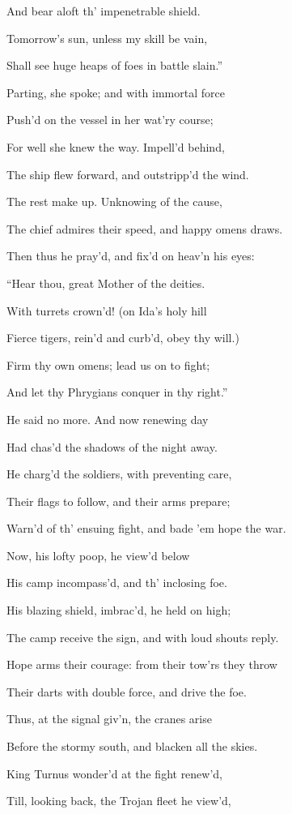 And bear aloft th’ impenetrable shield.

Tomorrow’s sun, unless my skill be vain,

Shall see huge heaps of foes in battle slain.”

Parting, she spoke; and with immortal force

Push’d on the vessel in her wat’ry course;

For well she knew the way. Impell’d behind,

The ship flew forward, and outstripp’d the wind.

The rest make up. Unknowing of the cause,

The chief admires their speed, and happy omens draws.

Then thus he pray’d, and fix’d on heav’n his eyes:

“Hear thou, great Mother of the deities.

With turrets crown’d! (on Ida’s holy hill

Fierce tigers, rein’d and curb’d, obey thy will.)

Firm thy own omens; lead us on to fight;

And let thy Phrygians conquer in thy right.”

He said no more. And now renewing day

Had chas’d the shadows of the night away.

He charg’d the soldiers, with preventing care,

Their flags to follow, and their arms prepare;

Warn’d of th’ ensuing fight, and bade ’em hope the war.

Now, his lofty poop, he view’d below

His camp incompass’d, and th’ inclosing foe.

His blazing shield, imbrac’d, he held on high;

The camp receive the sign, and with loud shouts reply.

Hope arms their courage: from their tow’rs they throw

Their darts with double force, and drive the foe.

Thus, at the signal giv’n, the cranes arise

Before the stormy south, and blacken all the skies.

King Turnus wonder’d at the fight renew’d,

Till, looking back, the Trojan fleet he view’d,

